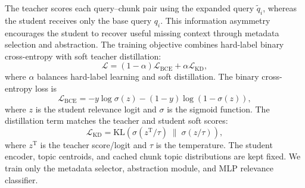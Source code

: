\documentclass{llmxive}
\begin{document}
The teacher scores each query--chunk pair using the expanded query $\tilde{q}_i$, whereas the student receives only the base query $q_i$. This information asymmetry encourages the student to recover useful missing context through metadata selection and abstraction. The training objective combines hard-label binary cross-entropy with soft teacher distillation:
\begin{equation}
    \mathcal{L}
    =
    (1-\alpha)\mathcal{L}_{\mathrm{BCE}}
    +
    \alpha \mathcal{L}_{\mathrm{KD}},
\end{equation}
where $\alpha$ balances hard-label learning and soft distillation. The binary cross-entropy loss is
\begin{equation}
    \mathcal{L}_{\mathrm{BCE}}
    =
    - y \log \sigma(z)
    - (1-y)\log(1-\sigma(z)),
\end{equation}
where $z$ is the student relevance logit and $\sigma$ is the sigmoid function. The distillation term matches the teacher and student soft scores:
\begin{equation}
    \mathcal{L}_{\mathrm{KD}}
    =
    \mathrm{KL}
    \left(
    \sigma(z^{\mathrm{T}}/\tau)
    \;\|\;
    \sigma(z/\tau)
    \right),
\end{equation}
where $z^{\mathrm{T}}$ is the teacher score/logit and $\tau$ is the temperature. The student encoder, topic centroids, and cached chunk topic distributions are kept fixed. We train only the metadata selector, abstraction module, and MLP relevance classifier.
\end{document}
